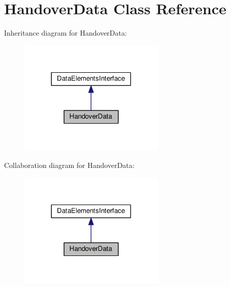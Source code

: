 \hypertarget{class_handover_data}{}\section{Handover\+Data Class Reference}
\label{class_handover_data}


Inheritance diagram for Handover\+Data\+:
\nopagebreak
\begin{figure}[H]
\begin{center}
\leavevmode
\includegraphics[width=197pt]{class_handover_data__inherit__graph}
\end{center}
\end{figure}


Collaboration diagram for Handover\+Data\+:
\nopagebreak
\begin{figure}[H]
\begin{center}
\leavevmode
\includegraphics[width=197pt]{class_handover_data__coll__graph}
\end{center}
\end{figure}
